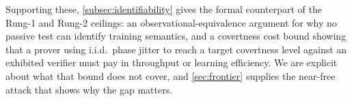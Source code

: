 Supporting these, \cref{subsec:identifiability} gives the formal counterpart of
the Rung-1 and Rung-2 ceilings: an observational-equivalence argument for why
no passive test can identify training semantics, and a covertness cost bound
showing that a prover using i.i.d.\ phase jitter to reach a target covertness
level against an exhibited verifier must pay in throughput or learning
efficiency. We are explicit about what that bound does not cover, and
\cref{sec:frontier} supplies the near-free attack that shows why the gap
matters.
